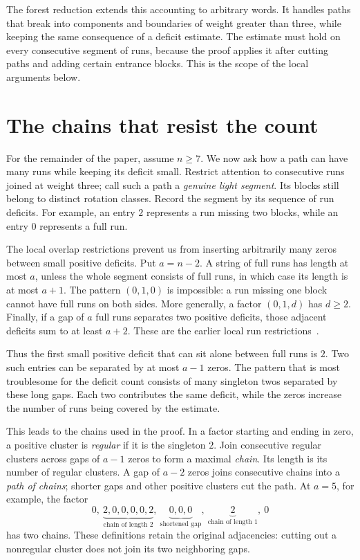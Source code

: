 The forest reduction extends this accounting to arbitrary words. It
handles paths that break into components and boundaries of weight greater
than three, while keeping the same consequence of a deficit estimate.
The estimate must hold on every consecutive segment of runs, because
the proof applies it after cutting paths and adding certain entrance
blocks. This is the scope of the local arguments below.

\section{The chains that resist the count}

For the remainder of the paper, assume $n\ge7$. We now ask how a path
can have many runs while keeping its deficit small.
Restrict attention to consecutive runs joined at weight three; call such
a path a \emph{genuine light segment}. Its blocks still belong to distinct
rotation classes. Record the segment by its sequence of run deficits.
For example, an entry $2$ represents a run missing two blocks, while an
entry $0$ represents a full run.

The local overlap restrictions prevent us from inserting arbitrarily
many zeros between small positive deficits. Put $a=n-2$. A string of
full runs has length at most $a$, unless the whole segment consists
of full runs, in which case its length is at most $a+1$. The pattern
$(0,1,0)$ is impossible: a run missing one block cannot have full runs
on both sides. More generally, a factor $(0,1,d)$ has $d\ge2$.
Finally, if a gap of $a$ full runs separates two positive deficits,
those adjacent deficits sum to at least $a+2$. These are the earlier
local run restrictions~\cite{pantone-framework}.

Thus the first small positive deficit that can sit alone between full
runs is $2$. Two such entries can be separated by at most $a-1$ zeros.
The pattern that is most troublesome for the deficit count consists of
many singleton twos separated by these long gaps. Each two contributes
the same deficit, while the zeros increase the number of runs being
covered by the estimate.

This leads to the chains used in the proof. In a factor starting and
ending in zero, a positive cluster is \emph{regular} if it is the
singleton $2$. Join consecutive regular clusters across gaps of $a-1$
zeros to form a maximal \emph{chain}. Its length is its number of
regular clusters. A gap of $a-2$ zeros joins consecutive chains into a
\emph{path of chains}; shorter gaps and other positive clusters cut the
path. At $a=5$, for example, the factor
\[
 0,\ \underbrace{2,0,0,0,0,2}_{\text{chain of length 2}},\
 \underbrace{0,0,0}_{\text{shortened gap}},\
 \underbrace{2}_{\text{chain of length 1}},\ 0
\]
has two chains. These definitions retain the original adjacencies:
cutting out a nonregular cluster does not join its two neighboring gaps.

